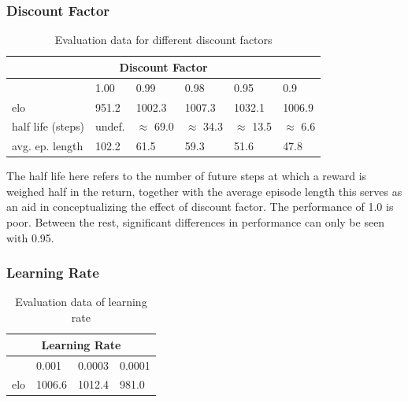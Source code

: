 \subsubsection{Discount Factor}\label{subsec:tr:opt_alg:params:discount}
\begin{table}[H]
\begin{center}
\begin{tabular}{ |l|p{1.25cm}|p{1.25cm}|p{1.25cm}|p{1.25cm}|p{1.25cm}|  }
 \hline
 \multicolumn{6}{|c|}{Discount Factor} \\
 \hline
 \hline
  & 1.00 & 0.99 & 0.98 & 0.95 & 0.9 \\
 \hline
 elo & 951.2 & 1002.3 & 1007.3 & 1032.1 & 1006.9 \\
 
 half life (steps) & undef. & $\approx$ 69.0 & $\approx$ 34.3 & $\approx$ 13.5 & $\approx$ 6.6 \\
 
 avg. ep. length & 102.2 & 61.5 & 59.3 & 51.6 & 47.8 \\
 \hline
\end{tabular}
\end{center}
\caption{Evaluation data for different discount factors}
\label{tab:elo_lr}
\end{table}

\noindent
The half life here refers to the number of future steps at which a reward is weighed half in the return, together with the average episode length this serves as an aid in conceptualizing the effect of discount factor. The performance of 1.0 is poor. Between the rest, significant differences in performance can only be seen with 0.95.

\subsubsection{Learning Rate}\label{subsubsec:tr:opt_alg:params:lr}
\begin{table}[H]
\begin{center}
\begin{tabular}{ |l|p{1.25cm}|p{1.25cm}|p{1.25cm}|  }
 \hline
 \multicolumn{4}{|c|}{Learning Rate} \\
 \hline
 \hline
  & 0.001 & 0.0003 & 0.0001 \\
 \hline
 elo & 1006.6 & 1012.4 & 981.0 \\
 \hline
\end{tabular}
\end{center}
\caption{Evaluation data of learning rate}
\label{tab:elo_lr}
\end{table}

